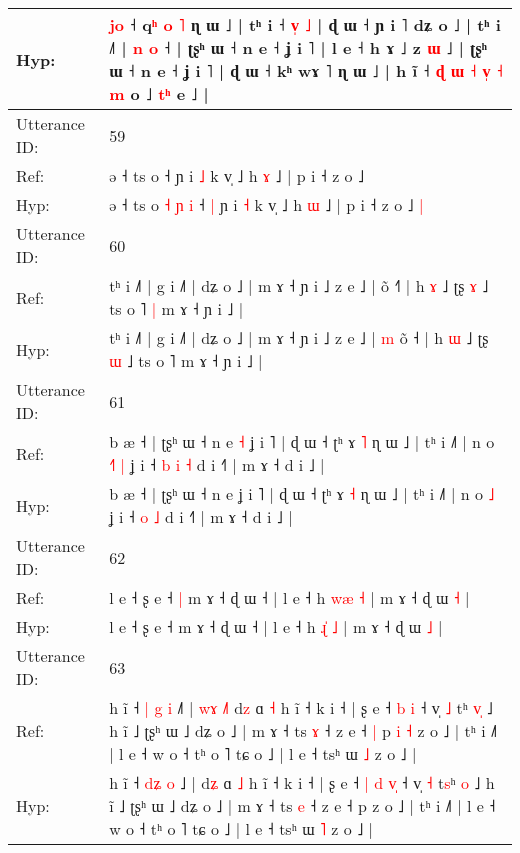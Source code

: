 \documentclass[10pt]{article}
\DeclareRobustCommand{\hl}[1]{{\textcolor{red}{#1}}}
\begin{document}
\begin{longtable}{ll}
 \\
Hyp: & \hl{}\hl{j}\hl{o} ˧ q\hl{}\hl{}\hl{}\hl{}\hl{ʰ} \hl{}\hl{o} \hl{˥} ɳ ɯ ˩ | tʰ i ˧ \hl{}\hl{v}\hl{̩} \hl{˩} | ɖ ɯ ˧ ɲ i ˥ dʑ o ˩ | tʰ i ˩˥ | \hl{n}\hl{ }\hl{o} ˧\hl{} | ʈʂʰ ɯ ˧ n e ˧ ʝ i ˥ | l e ˧ h ɤ ˩ z \hl{ɯ} ˩ | ʈʂʰ ɯ ˧ n e ˧ ʝ i ˥ | ɖ ɯ ˧ kʰ wɤ ˥ ɳ ɯ ˩ | h ĩ ˧ \hl{ɖ} \hl{ɯ} \hl{˧} \hl{v}\hl{̩} \hl{˧} \hl{m} o ˩ \hl{t}\hl{ʰ} e ˩ |
 \\
\midrule
Utterance ID: & 59 \\
Ref: & ə ˧ ts o\hl{}\hl{}\hl{}\hl{}\hl{}\hl{} ˧\hl{}\hl{} ɲ i \hl{˩} k v̩ ˩ h \hl{ɤ} ˩ | p i ˧ z o ˩\hl{}\hl{}
 \\
Hyp: & ə ˧ ts o\hl{ }\hl{˧}\hl{ }\hl{ɲ}\hl{ }\hl{i} ˧\hl{ }\hl{|} ɲ i \hl{˧} k v̩ ˩ h \hl{ɯ} ˩ | p i ˧ z o ˩\hl{ }\hl{|}
 \\
\midrule
Utterance ID: & 60 \\
Ref: & tʰ i ˩˥ | g i ˩˥ | dʑ o ˩ | m ɤ ˧ ɲ i ˩ z e ˩ |\hl{}\hl{} õ ˧\hl{˥} | h \hl{ɤ} ˩ ʈʂ \hl{ɤ} ˩ ts o ˥\hl{ }\hl{|} m ɤ ˧ ɲ i ˩ |
 \\
Hyp: & tʰ i ˩˥ | g i ˩˥ | dʑ o ˩ | m ɤ ˧ ɲ i ˩ z e ˩ |\hl{ }\hl{m} õ ˧\hl{} | h \hl{ɯ} ˩ ʈʂ \hl{ɯ} ˩ ts o ˥\hl{}\hl{} m ɤ ˧ ɲ i ˩ |
 \\
\midrule
Utterance ID: & 61 \\
Ref: & b æ ˧ | ʈʂʰ ɯ ˧ n e\hl{ }\hl{˧} ʝ i ˥ | ɖ ɯ ˧ ʈʰ ɤ \hl{˥} ɳ ɯ ˩ | tʰ i ˩˥ | n o\hl{ }\hl{˧}\hl{˥} \hl{|} ʝ i ˧\hl{ }\hl{b} \hl{i} \hl{˧} d i ˧˥ | m ɤ ˧ d i ˩ |
 \\
Hyp: & b æ ˧ | ʈʂʰ ɯ ˧ n e\hl{}\hl{} ʝ i ˥ | ɖ ɯ ˧ ʈʰ ɤ \hl{˧} ɳ ɯ ˩ | tʰ i ˩˥ | n o\hl{}\hl{}\hl{} \hl{˩} ʝ i ˧\hl{}\hl{} \hl{o} \hl{˩} d i ˧˥ | m ɤ ˧ d i ˩ |
 \\
\midrule
Utterance ID: & 62 \\
Ref: & l e ˧ ʂ e ˧\hl{ }\hl{|} m ɤ ˧ ɖ ɯ ˧ | l e ˧ h \hl{w}\hl{æ} \hl{˧} | m ɤ ˧ ɖ ɯ \hl{˧} |
 \\
Hyp: & l e ˧ ʂ e ˧\hl{}\hl{} m ɤ ˧ ɖ ɯ ˧ | l e ˧ h \hl{ɻ}\hl{̍} \hl{˩} | m ɤ ˧ ɖ ɯ \hl{˩} |
 \\
\midrule
Utterance ID: & 63 \\
Ref: & h ĩ ˧ \hl{|}\hl{ }\hl{g} \hl{i} ˩\hl{˥} |\hl{ }\hl{w}\hl{ɤ}\hl{ }\hl{˩}\hl{˥} d\hl{z} ɑ \hl{˧} h ĩ ˧ k i ˧ | ʂ e ˧\hl{}\hl{} \hl{b} \hl{}\hl{i} ˧ v̩ \hl{˩} t\hl{}ʰ \hl{v}\hl{̩} ˩ h ĩ ˩ ʈʂʰ ɯ ˩ dʑ o ˩ | m ɤ ˧ ts \hl{ɤ} ˧ z e ˧\hl{ }\hl{|} p\hl{ }\hl{i}\hl{ }\hl{˧} z o ˩ | tʰ i ˩˥ | l e ˧ w o ˧ tʰ o ˥ tɕ o ˩ | l e ˧ tsʰ ɯ \hl{˩} z o ˩ |
 \\
Hyp: & h ĩ ˧ \hl{}\hl{d}\hl{ʑ} \hl{o} ˩\hl{} |\hl{}\hl{}\hl{}\hl{}\hl{}\hl{} d\hl{ʑ} ɑ \hl{˩} h ĩ ˧ k i ˧ | ʂ e ˧\hl{ }\hl{|} \hl{d} \hl{v}\hl{̩} ˧ v̩ \hl{˧} t\hl{s}ʰ \hl{}\hl{o} ˩ h ĩ ˩ ʈʂʰ ɯ ˩ dʑ o ˩ | m ɤ ˧ ts \hl{e} ˧ z e ˧\hl{}\hl{} p\hl{}\hl{}\hl{}\hl{} z o ˩ | tʰ i ˩˥ | l e ˧ w o ˧ tʰ o ˥ tɕ o ˩ | l e ˧ tsʰ ɯ \hl{˥} z o ˩ |

\end{longtable}
\end{document}
